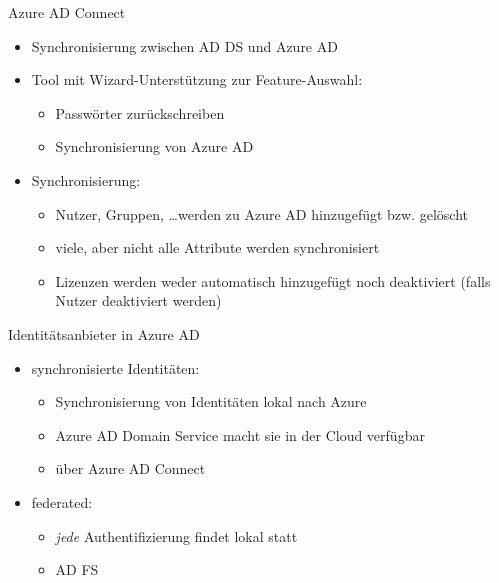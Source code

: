 \begin{flashcard}[Definition]{Azure AD Connect}
  \begin{itemize}
    \item Synchronisierung zwischen AD DS und Azure AD
    \item Tool mit Wizard-Unterstützung zur Feature-Auswahl:
    \begin{itemize}
      \item Passwörter zurückschreiben
      \item Synchronisierung von Azure AD
    \end{itemize}
    \item Synchronisierung:
    \begin{itemize}
      \item Nutzer, Gruppen, \ldots werden zu Azure AD hinzugefügt bzw. gelöscht
      \item viele, aber nicht alle Attribute werden synchronisiert
      \item Lizenzen werden weder automatisch hinzugefügt noch deaktiviert (falls Nutzer deaktiviert werden)
    \end{itemize}
  \end{itemize}
\end{flashcard}

\begin{flashcard}[Definition]{Identitätsanbieter in Azure AD}
  \begin{itemize}
    \item synchronisierte Identitäten:\newline
      \begin{itemize}
        \item Synchronisierung von Identitäten lokal nach Azure
        \item Azure AD Domain Service macht sie in der Cloud verfügbar
        \item über Azure AD Connect
      \end{itemize}
    \item federated:
      \begin{itemize}
        \item \emph{jede} Authentifizierung findet lokal statt
        \item AD FS
      \end{itemize}
  \end{itemize}
\end{flashcard}


